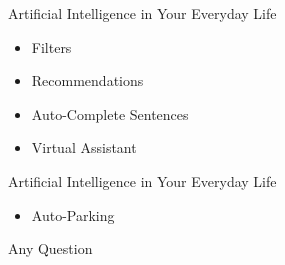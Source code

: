 \documentclass{beamer}
\begin{document}
\begin{frame}{Artificial Intelligence in Your Everyday Life}
\begin{itemize}
\item Filters
\item Recommendations
\item Auto-Complete Sentences
\item Virtual Assistant
\end{itemize}
\end{frame}

\begin{frame}{Artificial Intelligence in Your Everyday Life}
\begin{itemize}
    \item Auto-Parking
\end{itemize}
\end{frame}

\begin{frame}{Any Question}
\end{frame}
\end{document}
